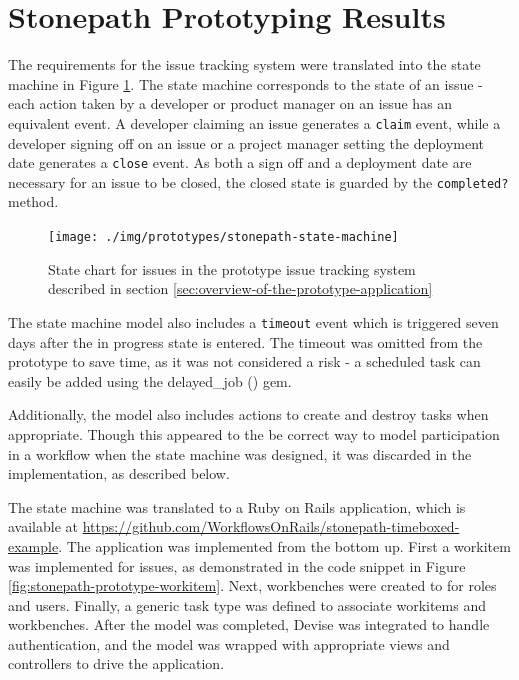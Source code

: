 \section {Stonepath Prototyping Results}
\label {sec:stonepath-prototyping-results}

The requirements for the issue tracking system were translated into the state machine in Figure \ref{fig:stonepath-prototype-state-machine}. The state machine corresponds to the state of an issue - each action taken by a developer or product manager on an issue has an equivalent event. A developer claiming an issue generates a \verb!claim! event, while a developer signing off on an issue or a project manager setting the deployment date generates a \verb!close! event. As both a sign off and a deployment date are necessary for an issue to be closed, the closed state is guarded by the \verb!completed?! method.

\begin{figure}[!ht]
\centering \texttt{[image: ./img/prototypes/stonepath-state-machine]}
\caption{State chart for issues in the prototype issue tracking system described in section \ref{sec:overview-of-the-prototype-application}}
\label{fig:stonepath-prototype-state-machine}
\end{figure}

The state machine model also includes a \verb!timeout! event which is triggered seven days after the in progress state is entered. The timeout was omitted from the prototype to save time, as it was not considered a risk - a scheduled task can easily be added using the delayed\_job () gem.

Additionally, the model also includes actions to create and destroy tasks when appropriate. Though this appeared to the be correct way to model participation in a workflow when the state machine was designed, it was discarded in the implementation, as described below.

The state machine was translated to a Ruby on Rails application, which is available at \url{https://github.com/WorkflowsOnRails/stonepath-timeboxed-example}. The application was implemented from the bottom up. First a workitem was implemented for issues, as demonstrated in the code snippet in Figure \ref{fig:stonepath-prototype-workitem}. Next, workbenches were created to for roles and users. Finally, a generic task type was defined to associate workitems and workbenches. After the model was completed, Devise was integrated to handle authentication, and the model was wrapped with appropriate views and controllers to drive the application.

